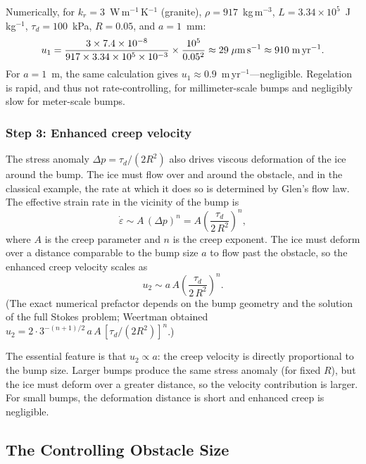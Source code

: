 \documentclass[11pt]{article}
\begin{document}
\medskip
\noindent Numerically, for $k_r = 3$~W\,m$^{-1}$\,K$^{-1}$ (granite), $\rho = 917$~kg\,m$^{-3}$, $L = 3.34 \times 10^5$~J\,kg$^{-1}$, $\tau_d = 100$~kPa, $R = 0.05$, and $a = 1$~mm:
\begin{equation*}
  u_1 = \frac{3 \times 7.4 \times 10^{-8}}{917 \times 3.34 \times 10^5 \times 10^{-3}} \times \frac{10^5}{0.05^2} \approx 29\;\mu\text{m\,s}^{-1} \approx 910\;\text{m\,yr}^{-1}.
\end{equation*}
For $a = 1$~m, the same calculation gives $u_1 \approx 0.9$~m\,yr$^{-1}$---negligible.  Regelation is rapid, and thus not rate-controlling, for millimeter-scale bumps and negligibly slow for meter-scale bumps.

\subsubsection{Step 3: Enhanced creep velocity}

The stress anomaly $\Delta p = \tau_d / (2R^2)$ also drives viscous deformation of the ice around the bump.  The ice must flow over and around the obstacle, and in the classical example, the rate at which it does so is determined by Glen's flow law.  The effective strain rate in the vicinity of the bump is
\begin{equation}
  \dot{\varepsilon} \sim A\,(\Delta p)^n = A\left(\frac{\tau_d}{2\,R^2}\right)^n,
  \label{eq:creep_strain_rate}
\end{equation}
where $A$ is the creep parameter and $n$ is the creep exponent.  The ice must deform over a distance comparable to the bump size $a$ to flow past the obstacle, so the enhanced creep velocity scales as
\begin{equation}
  \boxed{u_2 \sim a\,A\left(\frac{\tau_d}{2\,R^2}\right)^n.}
  \label{eq:enhanced_creep}
\end{equation}
(The exact numerical prefactor depends on the bump geometry and the solution of the full Stokes problem; Weertman obtained $u_2 = 2\cdot 3^{-(n+1)/2}\,a\,A\,[\tau_d/(2R^2)]^n$.)

The essential feature is that $u_2 \propto a$: the creep velocity is directly proportional to the bump size.  Larger bumps produce the same stress anomaly (for fixed $R$), but the ice must deform over a greater distance, so the velocity contribution is larger.  For small bumps, the deformation distance is short and enhanced creep is negligible.

\subsection{The Controlling Obstacle Size}
\end{document}
